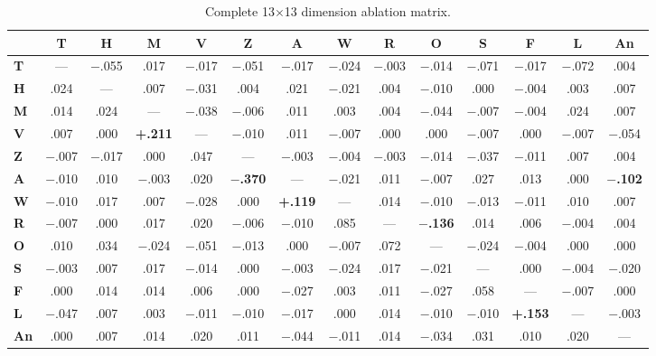 \documentclass{article}
\begin{document}
\begin{table}[htbp]
\centering
\tiny
\caption{Complete 13$\times$13 dimension ablation matrix.}
\label{tab:dimablation_full}
\begin{tabular}{l|ccccccccccccc}
\toprule
 & T & H & M & V & Z & A & W & R & O & S & F & L & An \\
\midrule
\textbf{T} & --- & $-$.055 & .017 & $-$.017 & $-$.051 & $-$.017 & $-$.024 & $-$.003 & $-$.014 & $-$.071 & $-$.017 & $-$.072 & .004 \\
\textbf{H} & .024 & --- & .007 & $-$.031 & .004 & .021 & $-$.021 & .004 & $-$.010 & .000 & $-$.004 & .003 & .007 \\
\textbf{M} & .014 & .024 & --- & $-$.038 & $-$.006 & .011 & .003 & .004 & $-$.044 & $-$.007 & $-$.004 & .024 & .007 \\
\textbf{V} & .007 & .000 & \textbf{+.211} & --- & $-$.010 & .011 & $-$.007 & .000 & .000 & $-$.007 & .000 & $-$.007 & $-$.054 \\
\textbf{Z} & $-$.007 & $-$.017 & .000 & .047 & --- & $-$.003 & $-$.004 & $-$.003 & $-$.014 & $-$.037 & $-$.011 & .007 & .004 \\
\textbf{A} & $-$.010 & .010 & $-$.003 & .020 & \textbf{$-$.370} & --- & $-$.021 & .011 & $-$.007 & .027 & .013 & .000 & \textbf{$-$.102} \\
\textbf{W} & $-$.010 & .017 & .007 & $-$.028 & .000 & \textbf{+.119} & --- & .014 & $-$.010 & $-$.013 & $-$.011 & .010 & .007 \\
\textbf{R} & $-$.007 & .000 & .017 & .020 & $-$.006 & $-$.010 & .085 & --- & \textbf{$-$.136} & .014 & .006 & $-$.004 & .004 \\
\textbf{O} & .010 & .034 & $-$.024 & $-$.051 & $-$.013 & .000 & $-$.007 & .072 & --- & $-$.024 & $-$.004 & .000 & .000 \\
\textbf{S} & $-$.003 & .007 & .017 & $-$.014 & .000 & $-$.003 & $-$.024 & .017 & $-$.021 & --- & .000 & $-$.004 & $-$.020 \\
\textbf{F} & .000 & .014 & .014 & .006 & .000 & $-$.027 & .003 & .011 & $-$.027 & .058 & --- & $-$.007 & .000 \\
\textbf{L} & $-$.047 & .007 & .003 & $-$.011 & $-$.010 & $-$.017 & .000 & .014 & $-$.010 & $-$.010 & \textbf{+.153} & --- & $-$.003 \\
\textbf{An} & .000 & .007 & .014 & .020 & .011 & $-$.044 & $-$.011 & .014 & $-$.034 & .031 & .010 & .020 & --- \\
\bottomrule
\end{tabular}
\end{table}
\end{document}
